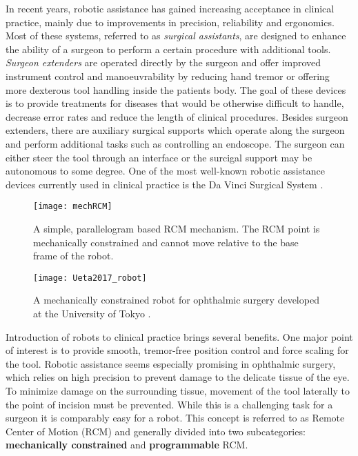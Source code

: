 In recent years, robotic assistance has gained increasing acceptance in clinical practice, mainly due to improvements in precision, reliability and ergonomics. Most of these systems, referred to as \textit{surgical assistants}, are designed to enhance the ability of a surgeon to perform a certain procedure with additional tools. \textit{Surgeon extenders} are operated directly by the surgeon and offer improved instrument control and manoeuvrability by reducing hand tremor or offering more dexterous tool handling inside the patients body. The goal of these devices is to provide treatments for diseases that would be otherwise difficult to handle, decrease error rates and reduce the length of clinical procedures. Besides surgeon extenders, there are auxiliary surgical supports which operate along the surgeon and perform additional tasks such as controlling an endoscope. The surgeon can either steer the tool through an interface or the surcigal support may be autonomous to some degree. One of the most well-known robotic assistance devices currently used in clinical practice is the Da Vinci Surgical System \cite{DaVinci}.

\begin{figure}[t!]
	\centering
	\texttt{[image: mechRCM]}
	\caption{A simple, parallelogram based RCM mechanism. The RCM point is mechanically constrained and cannot move relative to the base frame of the robot.}
	\label{mechRCM}
\end{figure}
\begin{figure}[b!]
	\centering
	\texttt{[image: Ueta2017\_robot]}
	\caption{A mechanically constrained robot for ophthalmic surgery developed at the University of Tokyo \cite{Ueta2017}.}
	\label{Ueta2017img}
\end{figure}

Introduction of robots to clinical practice brings several benefits. One major point of interest is to provide smooth, tremor-free position control and force scaling for the tool. Robotic assistance seems especially promising in ophthalmic surgery, which relies on high precision to prevent damage to the delicate tissue of the eye. To minimize damage on the surrounding tissue, movement of the tool laterally to the point of incision must be prevented. While this is a challenging task for a surgeon it is comparably easy for a robot. This concept is referred to as Remote Center of Motion (RCM) and generally divided into two subcategories: \textbf{mechanically constrained} and \textbf{programmable} RCM. 

